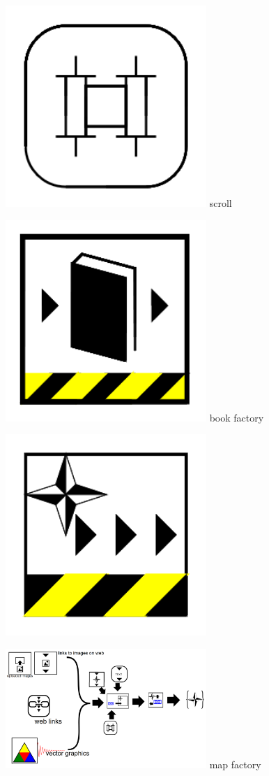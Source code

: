 \documentclass[11pt]{article}
\begin{document}
\includegraphics[width=3in]{image5.png}
scroll

\includegraphics[width=3in]{image6.png}
book factory

\includegraphics[width=3in]{image7.png}

\includegraphics[width=3in]{image8.png}
map factory
\end{document}
